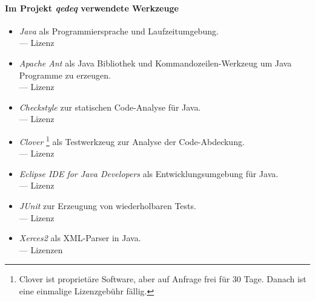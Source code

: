 \begin{offen}%

\paragraph{Im Projekt \emph{qedeq} verwendete Werkzeuge}%

\begin{itemize}
	\setcounter{enumi}{\value{Enumi}}%

	\item\label{Werkzeug:Java}\emph{Java} als Programmiersprache und Laufzeitumgebung.
	\\
	--- Lizenz 

	\item\label{Werkzeug:Apache Ant}\emph{Apache Ant} als Java Bibliothek und Kommandozeilen-Werkzeug
	um Java Programme zu erzeugen.
	\\
	--- Lizenz 

	\item\label{Werkzeug:Checkstyle}\emph{Checkstyle} zur statischen Code-Analyse für Java.
	\\
	--- Lizenz 

	\item\label{Werkzeug:Clover}\emph{Clover}%
	\footnote{%
		Clover ist proprietäre Software, aber auf Anfrage frei für 30 Tage.
		Danach ist eine einmalige Lizenzgebühr fällig.
	}
	als Testwerkzeug zur Analyse der Code-Abdeckung.
	\\
	--- Lizenz 

	\item\label{Werkzeug:Eclipse Java}\emph{Eclipse IDE for Java Developers} als Entwicklungsumgebung für Java.
	\\
	--- Lizenz 

	\item\label{Werkzeug:JUnit}\emph{JUnit} zur Erzeugung von wiederholbaren Tests.
	\\
	--- Lizenz 

	\item\label{Werkzeug:Xerces2}\emph{Xerces2} als XML-Parser in Java.
	\\
	--- Lizenzen 
\end{itemize}

\end{offen}%

